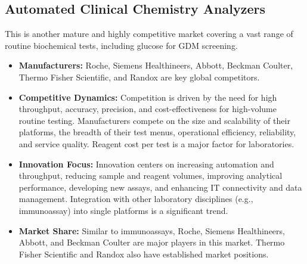 \documentclass{article}
\begin{document}
\subsection{Automated Clinical Chemistry Analyzers}
This is another mature and highly competitive market covering a vast range of routine biochemical tests, including glucose for GDM screening.
\begin{itemize}
    \item \textbf{Manufacturers:} Roche, Siemens Healthineers, Abbott, Beckman Coulter, Thermo Fisher Scientific, and Randox are key global competitors.
    \item \textbf{Competitive Dynamics:} Competition is driven by the need for high throughput, accuracy, precision, and cost-effectiveness for high-volume routine testing. Manufacturers compete on the size and scalability of their platforms, the breadth of their test menus, operational efficiency, reliability, and service quality. Reagent cost per test is a major factor for laboratories.
    \item \textbf{Innovation Focus:} Innovation centers on increasing automation and throughput, reducing sample and reagent volumes, improving analytical performance, developing new assays, and enhancing IT connectivity and data management. Integration with other laboratory disciplines (e.g., immunoassay) into single platforms is a significant trend.
    \item \textbf{Market Share:} Similar to immunoassays, Roche, Siemens Healthineers, Abbott, and Beckman Coulter are major players in this market. Thermo Fisher Scientific and Randox also have established market positions.
\end{itemize}
\end{document}
